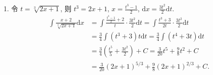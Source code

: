 \begin{solution}
\begin{enumerate}
        \item %
              令 $t = \sqrt[3]{2x + 1}$, 则 $t^3 = 2x + 1$, $x = \frac{t^3 - 1}{2}$, $\mathrm{d}x = \frac{3t^2}{2} \mathrm{d}t$.
              \begin{align*}
                  \int \frac{x + 2}{\sqrt[3]{2x + 1}} \mathrm{d}x & = \int \frac{\frac{t^3 - 1}{2} + 2}{t} \cdot \frac{3t^2}{2} \mathrm{d}t = \int \frac{t^3 + 3}{2t} \cdot \frac{3t^2}{2} \mathrm{d}t \\
                                                                  & = \frac{3}{4} \int (t^3 + 3) t \mathrm{d}t = \frac{3}{4} \int (t^4 + 3t) \mathrm{d}t                                               \\
                                                                  & = \frac{3}{4} \left( \frac{t^5}{5} + \frac{3t^2}{2} \right) + C = \frac{3}{20} t^5 + \frac{9}{8} t^2 + C                           \\
                                                                  & = \frac{3}{20} (2x+1)^{5/3} + \frac{9}{8} (2x+1)^{2/3} + C.
              \end{align*}


\end{enumerate}
\end{solution}
